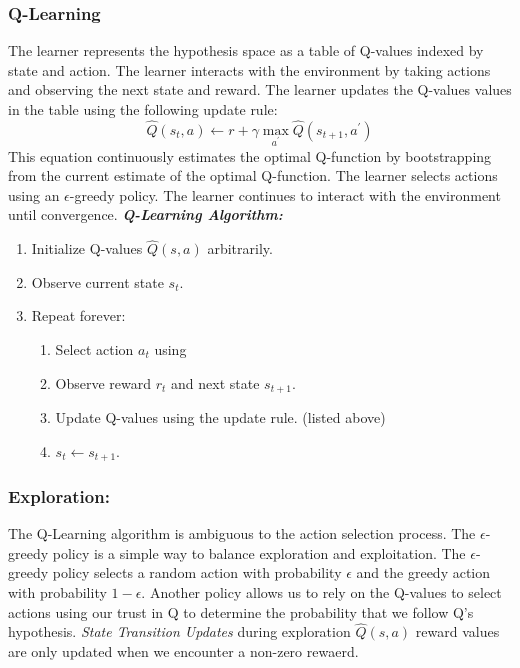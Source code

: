 \subsubsection{Q-Learning}
The learner represents the hypothesis space as a table of Q-values indexed by state and action. The learner interacts with the environment by taking actions and observing the next state and reward. The learner updates the Q-values values in the table using the following update rule:
\[
    \hat{Q}(s_t,a) \gets r + \gamma \max_{a^\prime} \hat{Q}(s_{t+1},a^\prime)
\]
This equation continuously estimates the optimal Q-function by bootstrapping from the current estimate of the optimal Q-function. The learner selects actions using an $\epsilon$-greedy policy. The learner continues to interact with the environment until convergence.
\emph{\textbf{Q-Learning Algorithm:}}
\begin{enumerate}
    \item Initialize Q-values $\hat{Q}(s,a)$ arbitrarily.
    \item Observe current state $s_t$.
    \item Repeat forever:
    \begin{enumerate}
        \item Select action $a_t$ using %
        \item Observe reward $r_t$ and next state $s_{t+1}$.
        \item Update Q-values using the update rule. (listed above)
        \item $s_t \gets s_{t+1}$.
    \end{enumerate}
\end{enumerate}
\subsubsection{Exploration:}
The Q-Learning algorithm is ambiguous to the action selection process. The $\epsilon$-greedy policy is a simple way to balance exploration and exploitation. The $\epsilon$-greedy policy selects a random action with probability $\epsilon$ and the greedy action with probability $1-\epsilon$. Another policy allows us to rely on the Q-values to select actions using our trust in Q to determine the probability that we follow Q's hypothesis. \emph{State Transition Updates} during exploration \(\hat{Q}(s,a)\) reward values are only updated when we encounter a non-zero rewaerd.

